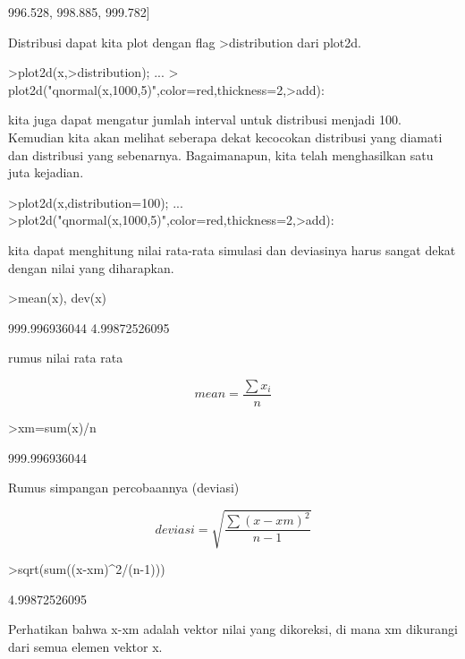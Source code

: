 \documentclass{article}
\begin{document}
\begin{eulernotebook}
\begin{eulercomment}
\begin{eulercomment}
\begin{euleroutput}
  996.528,  998.885,  999.782]
\end{euleroutput}
\begin{eulercomment}
Distribusi dapat kita plot dengan flag \textgreater{}distribution dari plot2d.
\end{eulercomment}
\begin{eulerprompt}
>plot2d(x,>distribution);  ...
> plot2d("qnormal(x,1000,5)",color=red,thickness=2,>add):
\end{eulerprompt}
\begin{eulercomment}
kita juga dapat mengatur jumlah interval untuk distribusi menjadi 100.
Kemudian kita akan melihat seberapa dekat kecocokan distribusi yang
diamati dan distribusi yang sebenarnya. Bagaimanapun, kita telah
menghasilkan satu juta kejadian.
\end{eulercomment}
\begin{eulerprompt}
>plot2d(x,distribution=100); ...
>plot2d("qnormal(x,1000,5)",color=red,thickness=2,>add):
\end{eulerprompt}
\begin{eulercomment}
kita dapat menghitung nilai rata-rata simulasi dan deviasinya harus
sangat dekat dengan nilai yang diharapkan.
\end{eulercomment}
\begin{eulerprompt}
>mean(x), dev(x)
\end{eulerprompt}
\begin{euleroutput}
  999.996936044
  4.99872526095
\end{euleroutput}
\begin{eulercomment}
rumus nilai rata rata

\end{eulercomment}
\begin{eulerformula}
\[
mean = \frac{\sum x_i}{n}
\]
\end{eulerformula}
\begin{eulerprompt}
>xm=sum(x)/n
\end{eulerprompt}
\begin{euleroutput}
  999.996936044
\end{euleroutput}
\begin{eulercomment}
Rumus simpangan percobaannya (deviasi)\\
\end{eulercomment}
\begin{eulerformula}
\[
deviasi= \sqrt{\frac{\sum (x - xm)^2}{n-1}}
\]
\end{eulerformula}
\begin{eulerprompt}
>sqrt(sum((x-xm)^2/(n-1)))
\end{eulerprompt}
\begin{euleroutput}
  4.99872526095
\end{euleroutput}
\begin{eulercomment}
Perhatikan bahwa x-xm adalah vektor nilai yang dikoreksi, di mana xm
dikurangi dari semua elemen vektor x.


\end{eulercomment}
\end{eulercomment}
\end{eulercomment}
\end{eulernotebook}
\end{document}
